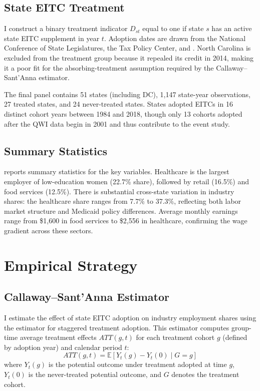 \documentclass[12pt]{article}
\newcommand{\E}{\mathbb{E}}
\begin{document}
\subsection{State EITC Treatment}

I construct a binary treatment indicator $D_{st}$ equal to one if state $s$ has an active state EITC supplement in year $t$. Adoption dates are drawn from the National Conference of State Legislatures, the Tax Policy Center, and \citet{williams2019}. North Carolina is excluded from the treatment group because it repealed its credit in 2014, making it a poor fit for the absorbing-treatment assumption required by the Callaway--Sant'Anna estimator.

The final panel contains 51 states (including DC), 1,147 state-year observations, 27 treated states, and 24 never-treated states. States adopted EITCs in 16 distinct cohort years between 1984 and 2018, though only 13 cohorts adopted after the QWI data begin in 2001 and thus contribute to the event study.

\subsection{Summary Statistics}



 reports summary statistics for the key variables. Healthcare is the largest employer of low-education women (22.7\% share), followed by retail (16.5\%) and food services (12.5\%). There is substantial cross-state variation in industry shares: the healthcare share ranges from 7.7\% to 37.3\%, reflecting both labor market structure and Medicaid policy differences. Average monthly earnings range from \$1,600 in food services to \$2,556 in healthcare, confirming the wage gradient across these sectors.


\section{Empirical Strategy}

\subsection{Callaway--Sant'Anna Estimator}

I estimate the effect of state EITC adoption on industry employment shares using the \citet{callaway2021} estimator for staggered treatment adoption. This estimator computes group-time average treatment effects $ATT(g,t)$ for each treatment cohort $g$ (defined by adoption year) and calendar period $t$:
\begin{equation}
ATT(g,t) = \E\left[Y_t(g) - Y_t(0) \mid G = g\right]
\label{eq:attgt}
\end{equation}
where $Y_t(g)$ is the potential outcome under treatment adopted at time $g$, $Y_t(0)$ is the never-treated potential outcome, and $G$ denotes the treatment cohort.
\end{document}
